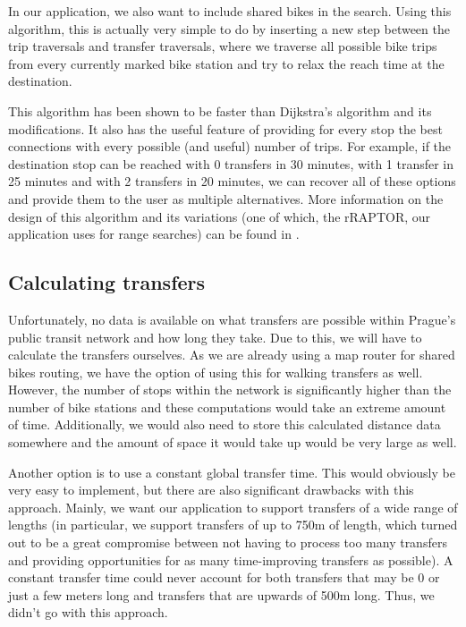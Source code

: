In our application, we also want to include shared bikes in the search. Using this algorithm, this is actually very simple to do by inserting a new step between the trip traversals and transfer traversals, where we traverse all possible bike trips from every currently marked bike station and try to relax the reach time at the destination.

This algorithm has been shown to be faster than Dijkstra's algorithm and its modifications\cite{delling2015raptor}. It also has the useful feature of providing for every stop the best connections with every possible (and useful) number of trips. For example, if the destination stop can be reached with 0 transfers in 30 minutes, with 1 transfer in 25 minutes and with 2 transfers in 20 minutes, we can recover all of these options and provide them to the user as multiple alternatives. More information on the design of this algorithm and its variations (one of which, the rRAPTOR, our application uses for range searches) can be found in \textcite{delling2015raptor}.

\subsection{Calculating transfers}

Unfortunately, no data is available on what transfers are possible within Prague's public transit network and how long they take. Due to this, we will have to calculate the transfers ourselves. As we are already using a map router for shared bikes routing, we have the option of using this for walking transfers as well. However, the number of stops within the network is significantly higher than the number of bike stations and these computations would take an extreme amount of time. Additionally, we would also need to store this calculated distance data somewhere and the amount of space it would take up would be very large as well.

Another option is to use a constant global transfer time. This would obviously be very easy to implement, but there are also significant drawbacks with this approach. Mainly, we want our application to support transfers of a wide range of lengths (in particular, we support transfers of up to 750m of length, which turned out to be a great compromise between not having to process too many transfers and providing opportunities for as many time-improving transfers as possible). A constant transfer time could never account for both transfers that may be 0 or just a few meters long and transfers that are upwards of 500m long. Thus, we didn't go with this approach.

